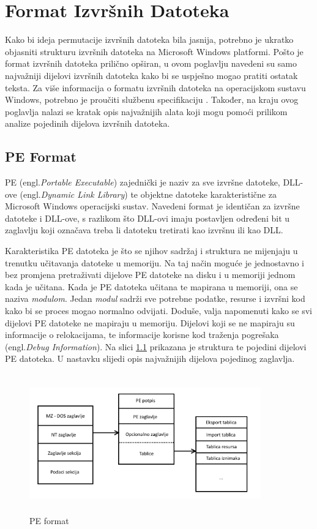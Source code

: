 \documentclass[times, utf8, diplomski, numeric]{fer}
\begin{document}
\chapter{Format Izvršnih Datoteka}
\label{sct:peFormat}
Kako bi ideja permutacije izvršnih datoteka bila jasnija, potrebno je ukratko objasniti strukturu izvršnih datoteka na Microsoft Windows platformi. Pošto je format izvršnih datoteka prilično opširan, u ovom poglavlju navedeni su samo najvažniji dijelovi izvršnih datoteka kako bi se uspješno mogao pratiti ostatak teksta. Za više informacija o formatu izvršnih datoteka na operacijskom sustavu Windows, potrebno je proučiti službenu specifikaciju \citep{pe_spec}. Također, na kraju ovog poglavlja nalazi se kratak opis najvažnijih alata koji mogu pomoći prilikom analize pojedinih dijelova izvršnih datoteka.
\section{PE Format}
PE (engl.\emph{Portable Executable}) zajednički je naziv za sve izvršne datoteke, DLL-ove (engl.\emph{Dynamic Link Library}) te objektne datoteke karakteristične za Microsoft Windows operacijski sustav. Navedeni format je identičan za izvršne datoteke i DLL-ove, s razlikom što DLL-ovi imaju postavljen određeni bit u zaglavlju koji označava treba li datoteku tretirati kao izvršnu ili kao DLL.

Karakteristika PE datoteka je što se njihov sadržaj i struktura ne mijenjaju u trenutku učitavanja datoteke u memoriju. Na taj način moguće je jednostavno i bez promjena pretraživati dijelove PE datoteke na disku i u memoriji jednom kada je učitana. Kada je PE datoteka učitana te mapirana u memoriji, ona se naziva \emph{modulom}. Jedan \emph{modul} sadrži sve potrebne podatke, resurse i izvršni kod kako bi se proces mogao normalno odvijati. Doduše, valja napomenuti kako se svi dijelovi PE datoteke ne mapiraju u memoriju. Dijelovi koji se ne mapiraju su informacije o relokacijama, te informacije korisne kod traženja pogrešaka (engl.\emph{Debug Information}). Na slici \ref{fig:pe_format} prikazana je struktura te pojedini dijelovi PE datoteka. U nastavku slijedi opis najvažnijih dijelova pojedinog zaglavlja.
\begin{figure}
\centering
\setlength\fboxsep{0pt}
\setlength\fboxrule{0.5pt}
\includegraphics[width=10cm, height=6cm]{slike/pe_format}
\caption{PE format}
\label{fig:pe_format} 
\end{figure} 
\end{document}
